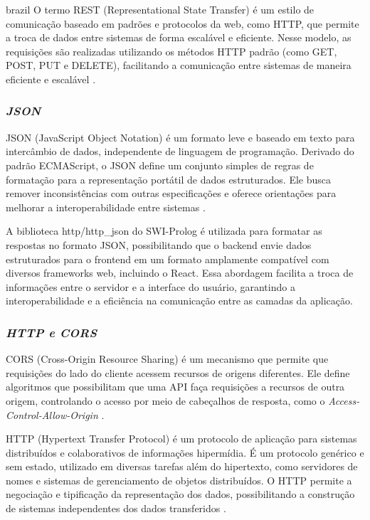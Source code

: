 \begin{otherlanguage*}{brazil}
O termo REST (Representational State Transfer) é um estilo de comunicação baseado em padrões e protocolos da web, como HTTP, que permite a troca de dados entre sistemas de forma escalável e eficiente. Nesse modelo, as requisições são realizadas utilizando os métodos HTTP padrão (como GET, POST, PUT e DELETE), facilitando a comunicação entre sistemas de maneira eficiente e escalável \cite{whatisrest}.

\subsubsection{\textbf{\textit{JSON}}}

JSON (JavaScript Object Notation) é um formato leve e baseado em texto para intercâmbio de dados, independente de linguagem de programação. Derivado do padrão ECMAScript, o JSON define um conjunto simples de regras de formatação para a representação portátil de dados estruturados. Ele busca remover inconsistências com outras especificações e oferece orientações para melhorar a interoperabilidade entre sistemas \cite{whatisjson}.

A biblioteca http/http\_json do SWI-Prolog é utilizada para formatar as respostas no formato JSON, possibilitando que o backend envie dados estruturados para o frontend em um formato amplamente compatível com diversos frameworks web, incluindo o React. Essa abordagem facilita a troca de informações entre o servidor e a interface do usuário, garantindo a interoperabilidade e a eficiência na comunicação entre as camadas da aplicação.

\subsubsection{\textbf{\textit{HTTP e CORS}}}

CORS (Cross-Origin Resource Sharing) é um mecanismo que permite que requisições do lado do cliente acessem recursos de origens diferentes. Ele define algoritmos que possibilitam que uma API faça requisições a recursos de outra origem, controlando o acesso por meio de cabeçalhos de resposta, como o \textit{Access-Control-Allow-Origin} \cite{whatiscors}.

HTTP (Hypertext Transfer Protocol) é um protocolo de aplicação para sistemas distribuídos e colaborativos de informações hipermídia. É um protocolo genérico e sem estado, utilizado em diversas tarefas além do hipertexto, como servidores de nomes e sistemas de gerenciamento de objetos distribuídos. O HTTP permite a negociação e tipificação da representação dos dados, possibilitando a construção de sistemas independentes dos dados transferidos \cite{whatishttp}.


\end{otherlanguage*}
